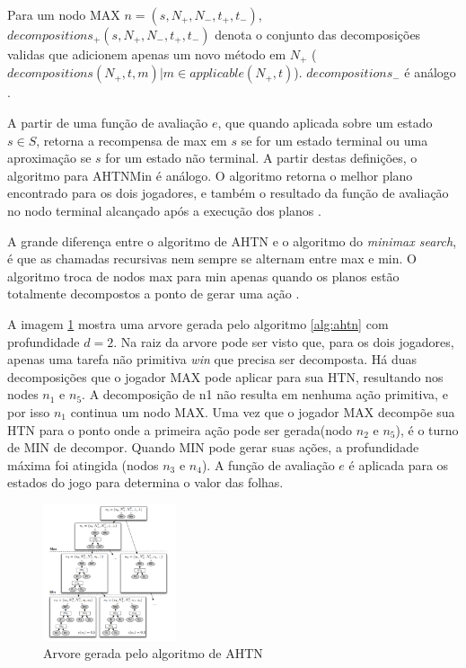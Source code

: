 Para um nodo MAX $n = (s, N_{+}, N_{-}, t_{+}, t_{-})$, $decompositions_{+}(s, N_{+}, N_{-}, t_{+}, t_{-})$ denota o conjunto das decomposições validas que adicionem apenas um novo método em $N_{+}$ (${decompositions(N_{+}, t, m) | m \in applicable(N_{+}, t)}$).  $decompositions_{-}$ é análogo \cite{ontanon2015adversarial}.

A partir de uma função de avaliação $e$, que quando aplicada sobre um estado $s \in S$, retorna a recompensa de max em $s$ se for um estado terminal ou uma aproximação se $s$ for um estado não terminal. A partir destas definições, o algoritmo para AHTNMin é análogo. O algoritmo retorna o melhor plano encontrado para os dois jogadores, e também o resultado da função de avaliação no nodo terminal alcançado após a execução dos planos \cite{ontanon2015adversarial}. 

A grande diferença entre o algoritmo de AHTN e o algoritmo do \textit{minimax search}, é que as chamadas recursivas nem sempre se alternam entre max e min. O algoritmo troca de nodos max para min apenas quando os planos estão totalmente decompostos a ponto de gerar uma ação \cite{ontanon2015adversarial}.

A imagem \ref{fig:ahtn} mostra uma arvore gerada pelo algoritmo \ref{alg:ahtn} com profundidade $d = 2$. Na raiz da arvore pode ser visto que, para os dois jogadores, apenas uma tarefa não primitiva \textit{win} que precisa ser decomposta. Há duas decomposições que o jogador MAX pode aplicar para sua HTN, resultando nos nodes $n_{1}$ e $n_{5}$. A decomposição de n1 não resulta em nenhuma ação primitiva, e por isso $n_{1}$ continua um nodo MAX. Uma vez que o jogador MAX decompõe sua HTN para o ponto onde a primeira ação pode ser gerada(nodo $n_{2}$ e $n_{5}$), é o turno de MIN de decompor. Quando MIN pode gerar suas ações, a profundidade máxima foi atingida (nodos $n_{3}$ e $n_{4}$). A função de avaliação $e$ é aplicada para os estados do jogo para determina o valor das folhas.

\begin{figure}[ht]
	\centering
	\includegraphics[width=0.35\textwidth]{fig/ahtn.pdf}
	\caption{Arvore gerada pelo algoritmo de AHTN}
	\label{fig:ahtn}
\end{figure} 
